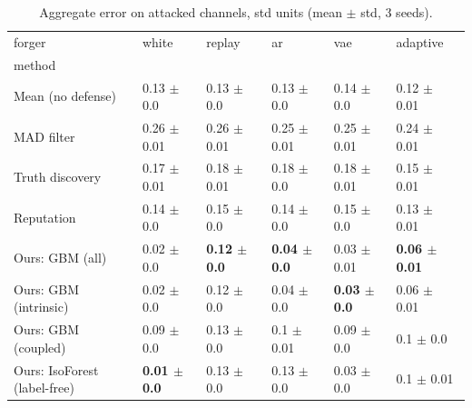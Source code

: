 \begin{table}
\caption{Aggregate error on attacked channels, std units (mean $\pm$ std, 3 seeds).}
\label{tab:err}
\begin{tabular}{llllll}
\toprule
forger & white & replay & ar & vae & adaptive \\
method &  &  &  &  &  \\
\midrule
Mean (no defense) & 0.13 $\pm$ 0.0 & 0.13 $\pm$ 0.0 & 0.13 $\pm$ 0.0 & 0.14 $\pm$ 0.0 & 0.12 $\pm$ 0.01 \\
MAD filter & 0.26 $\pm$ 0.01 & 0.26 $\pm$ 0.01 & 0.25 $\pm$ 0.01 & 0.25 $\pm$ 0.01 & 0.24 $\pm$ 0.01 \\
Truth discovery & 0.17 $\pm$ 0.01 & 0.18 $\pm$ 0.01 & 0.18 $\pm$ 0.0 & 0.18 $\pm$ 0.01 & 0.15 $\pm$ 0.01 \\
Reputation & 0.14 $\pm$ 0.0 & 0.15 $\pm$ 0.0 & 0.14 $\pm$ 0.0 & 0.15 $\pm$ 0.0 & 0.13 $\pm$ 0.01 \\
Ours: GBM (all) & 0.02 $\pm$ 0.0 & \textbf{0.12 $\pm$ 0.0} & \textbf{0.04 $\pm$ 0.0} & 0.03 $\pm$ 0.01 & \textbf{0.06 $\pm$ 0.01} \\
Ours: GBM (intrinsic) & 0.02 $\pm$ 0.0 & 0.12 $\pm$ 0.0 & 0.04 $\pm$ 0.0 & \textbf{0.03 $\pm$ 0.0} & 0.06 $\pm$ 0.01 \\
Ours: GBM (coupled) & 0.09 $\pm$ 0.0 & 0.13 $\pm$ 0.0 & 0.1 $\pm$ 0.01 & 0.09 $\pm$ 0.0 & 0.1 $\pm$ 0.0 \\
Ours: IsoForest (label-free) & \textbf{0.01 $\pm$ 0.0} & 0.13 $\pm$ 0.0 & 0.13 $\pm$ 0.0 & 0.03 $\pm$ 0.0 & 0.1 $\pm$ 0.01 \\
\bottomrule
\end{tabular}
\end{table}

